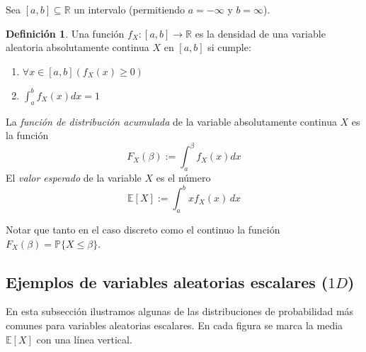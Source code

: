 \documentclass[12pt]{amsart}
\theoremstyle{definition}
\newtheorem{definition}[lemma]{Definición}
\renewcommand{\geq}{\geqslant}
\renewcommand{\leq}{\leqslant}
\newcommand{\PP}{\ensuremath{\mathbb{P}}}
\newcommand{\RR}{\ensuremath{\mathbb{R}}}
\newcommand{\EE}{\ensuremath{\mathbb{E}}}
\begin{document}
Sea $[a,b]\subseteq \RR$ un intervalo (permitiendo $a=-\infty$ y $b=\infty$).
\begin{definition} Una funci\'on $f_X:[a,b]\rightarrow \RR$ es la densidad de una variable aleatoria absolutamente continua $X$ en $[a,b]$ si cumple:
\begin{enumerate}
\item $\forall x\in [a,b]\left(f_X(x)\geq 0\right)$
\item $\int_a^bf_X(x)dx = 1$
\end{enumerate}
La \emph{función de distribución acumulada} de la variable absolutamente continua $X$ es la función
\[F_X(\beta):=\int_a^{\beta} f_X(x)dx\] 
El \emph{valor esperado} de la variable $X$ es el número
\[\EE[X]:=\int_a^b x f_X(x)\,dx\]
\end{definition}

Notar que tanto en el caso discreto como el continuo la función $F_X(\beta)=\PP\{X\leq \beta\}$.

\subsection{Ejemplos de variables aleatorias escalares ($1D$)}

En esta subsección ilustramos algunas de las distribuciones de probabilidad más comunes para variables aleatorias escalares. En cada figura se marca la media $\EE[X]$ con una línea vertical. 
\end{document}
